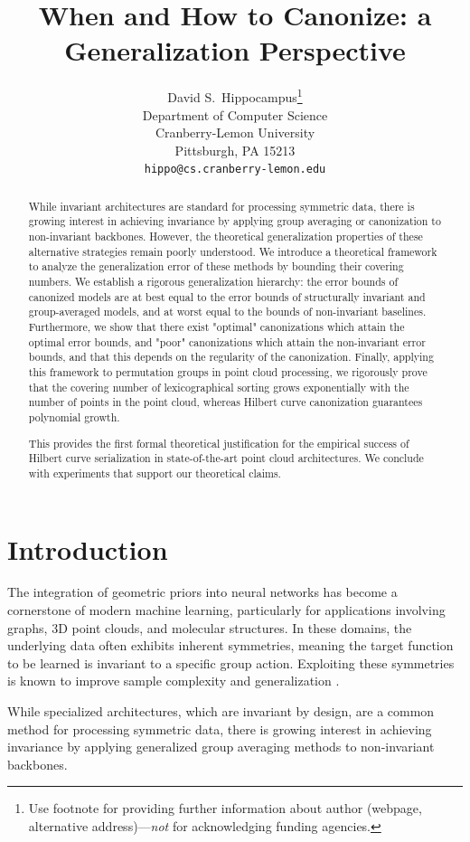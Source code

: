 \documentclass{article}
\title{When and How to Canonize: a Generalization Perspective}
\author{%
  David S.~Hippocampus\thanks{Use footnote for providing further information
    about author (webpage, alternative address)---\emph{not} for acknowledging
    funding agencies.} \\
  Department of Computer Science\\
  Cranberry-Lemon University\\
  Pittsburgh, PA 15213 \\
  \texttt{hippo@cs.cranberry-lemon.edu} \\
}
\begin{document}
\maketitle


\begin{abstract}

While invariant architectures are standard for processing symmetric data, there is growing interest in achieving invariance by applying group averaging or canonization to non-invariant backbones. However, the theoretical generalization properties of these alternative strategies remain poorly understood. We introduce a theoretical framework to analyze the generalization error of these methods by bounding their covering numbers. We establish a rigorous generalization hierarchy: the error bounds of canonized models are at best equal to the error bounds of structurally invariant and group-averaged models, and at worst equal to the bounds of non-invariant baselines. Furthermore, we show that there exist "optimal" canonizations which attain the optimal error bounds, and "poor" canonizations which attain the non-invariant error bounds, and that this depends on the regularity of the canonization. 
Finally, applying this framework to permutation groups in point cloud processing, we rigorously prove that the covering number of lexicographical sorting grows exponentially with the number of points in the point cloud, whereas Hilbert curve canonization guarantees polynomial growth.

This provides the first formal theoretical justification for the empirical success of Hilbert curve serialization in state-of-the-art point cloud architectures. We conclude with experiments that support our theoretical claims.
\end{abstract}
\section{Introduction}
The integration of geometric priors into neural networks has become a cornerstone of modern machine learning, particularly for applications involving graphs, 3D point clouds, and molecular structures. In these domains, the underlying data often exhibits inherent symmetries, meaning the target function to be learned is invariant to a specific group action. Exploiting these symmetries is known to improve sample complexity and generalization \cite{elesedy2021provably,brehmer2025doesequivariancematterscale}. 

While specialized architectures, which are invariant by design, are a common method for processing symmetric data, there is growing interest in achieving invariance by applying generalized group averaging methods to non-invariant backbones. 
\end{document}
